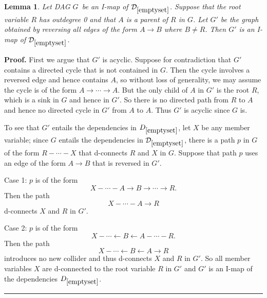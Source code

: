 \documentclass{elsarticle}%
\newtheorem{lemma}[theorem]{Lemma}
\renewenvironment{proof}[1][Proof]{\noindent\textbf{#1.} }{\ \rule{0.5em}{0.5em}}
\newcommand{\A}{A}
\newcommand{\B}{B}
\newcommand{\R}{R}
\newcommand{\X}{X}
\newcommand{\Y}{Y}
\newcommand{\G}{G}
\newcommand{\D}{\mathcal{D}}
\newcommand{\p}{p} %
\begin{document}
\begin{lemma} \label{ass:reverse}
{Let DAG }$G${\ be an I-map of }$\D_{\ref{emptyset}}$. Suppose that the root variable $\R$ has outdegree 0 and that $\A$ is a parent of $\R$ in $\G$. Let $G'$ be the
graph obtained by reversing all edges of the form $\A \rightarrow \B$ where $\B \neq \R$. Then $G'$ is an I-map of $\D_{\ref{emptyset}}$.
 \end{lemma}

\begin{proof} 
First we argue that $G'$ is acyclic. 
Suppose for contradiction
that $G'$ contains a directed cycle 
that is not contained in $G$. Then the cycle involves a reversed edge and hence contains $\A$, so without loss of generality, we may assume the cycle is of the form $\A \rightarrow \cdots \rightarrow \A$. But the only child of $\A$ in $\G'$ is the root $\R$, which is a sink in $\G$ and hence in $\G'$. So there is no directed path from $\R$ to $\A$ and hence no directed cycle in $\G'$ from $\A$ to $\A$. Thus $G'$ is acyclic since $G$ is.

To see that $G'$ entails the dependencies in
$D_{\ref{emptyset}}$, let $X$ be any member variable; since $\G$ entails the dependencies in $\D_{\ref{emptyset}}$, there is a path $p$ in $G
$ of the form $R-\cdots-X$ that d-connects $R$ and $X$ in $G$. 
%
Suppose that path $\p$ uses an edge of the form $\A \rightarrow \B$ that is reversed in $G'$.

Case 1: $p$ is of the form $$\X - \cdots - \A \rightarrow \B \rightarrow \cdots \rightarrow \R.$$ Then the path $$\X - \cdots - \A \rightarrow \R$$ d-connects $\X$ and $\R$ in $\G'$.

Case 2: $p$ is of the form $$\X - \cdots \leftarrow \B \leftarrow \A - \cdots - \R.$$ Then the path $$\X - \cdots \leftarrow \B \leftarrow \A \rightarrow \R$$ introduces no new collider and thus d-connects $\X$ and $\R$ in $\G'$. So all member variables $\X$ are d-connected to the root variable $\R$ in $\G'$ and $\G'$ is an I-map of the dependencies $D_{\ref{emptyset}}$. 
\end{proof}
\end{document}
